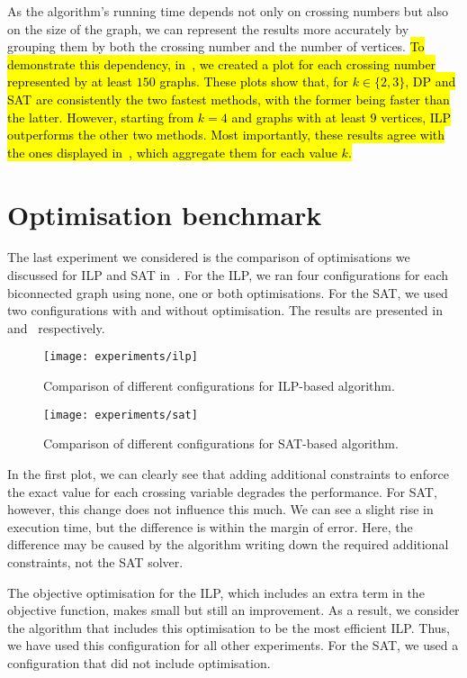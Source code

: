 As the algorithm's running time depends not only on crossing numbers but also on the size of the graph, we can represent the results more accurately by grouping them by both the crossing number and the number of vertices. \hl{To demonstrate this dependency, in~\mbox{}, we created a plot for each crossing number represented by at least {\(150\)} graphs. These plots show that, for \mbox{\(k \in \{2, 3\}\)}, {\textsf{DP}} and {\textsf{SAT}} are consistently the two fastest methods, with the former being faster than the latter. However, starting from \mbox{\(k = 4\)} and graphs with at least {\(9\)} vertices, {\textsf{ILP}} outperforms the other two methods. Most importantly, these results agree with the ones displayed in~\mbox{}, which aggregate them for each value {\(k\)}.}


\section{Optimisation benchmark}

The last experiment we considered is the comparison of optimisations we discussed for \textsf{ILP} and \textsf{SAT} in~. For the \textsf{ILP}, we ran four configurations for each biconnected graph using none, one or both optimisations. For the \textsf{SAT}, we used two configurations with and without optimisation. The results are presented in~ and~ respectively.

\begin{figure}[tbh]
    \centering
    \texttt{[image: experiments/ilp]}
    \caption{Comparison of different configurations for ILP-based algorithm.}
    \label{fig:optimisation:ilp}
\end{figure}

\begin{figure}[tbh]
    \centering
    \texttt{[image: experiments/sat]}
    \caption{Comparison of different configurations for SAT-based algorithm.}
    \label{fig:optimisation:sat}
\end{figure}

In the first plot, we can clearly see that adding additional constraints to enforce the exact value for each crossing variable degrades the performance. For \textsf{SAT}, however, this change does not influence this much. We can see a slight rise in execution time, but the difference is within the margin of error. Here, the difference may be caused by the algorithm writing down the required additional constraints, not the SAT solver.

The objective optimisation for the \textsf{ILP}, which includes an extra term in the objective function, makes small but still an improvement. As a result, we consider the algorithm that includes this optimisation to be the most efficient \textsf{ILP}. Thus, we have used this configuration for all other experiments. For the \textsf{SAT}, we used a configuration that did not include optimisation.
